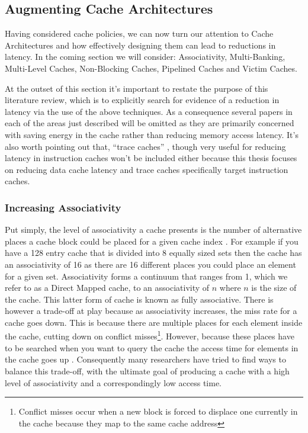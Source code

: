 \subsection{Augmenting Cache Architectures}
Having considered cache policies, we can now turn our attention to Cache Architectures and how effectively designing them can lead to reductions in latency. In the coming section we will consider: Associativity, Multi-Banking, Multi-Level Caches, Non-Blocking Caches, Pipelined Caches and Victim Caches. 

At the outset of this section it's important to restate the purpose of this literature review, which is to explicitly search for evidence of a reduction in latency via the use of the above techniques. As a consequence several papers in each of the areas just described will be omitted as they are primarily concerned with saving energy in the cache rather than reducing memory access latency. It's also worth pointing out that, ``trace caches''\cite{rotenbergTraceCacheMicroarchitecture1999, ramirezTraceCacheRedundancy2000} , though very useful for reducing latency in instruction caches won't be included either because this thesis focuses on reducing data cache latency and trace caches specifically target instruction caches.

\subsubsection{Increasing Associativity}

Put simply, the level of associativity a cache presents is the number of alternative places a cache block could be placed for a given cache index \cite{pachecoParallelHardwareParallel2011}. For example if you have a 128 entry cache that is divided into 8 equally sized sets then the cache has an associativity of 16 as there are 16 different places you could place an element for a given set. Associativity forms a continuum that ranges from 1, which we refer to as a Direct Mapped cache, to an associativity of $n$ where $n$ is the size of the cache. This latter form of cache is known as fully associative. There is however a trade-off at play because as associativity increases, the miss rate for a cache goes down. This is because there are multiple places for each element inside the cache, cutting down on conflict misses\footnote{Conflict misses occur when a new block is forced to displace one currently in the cache because they map to the same cache address}. However, because these places have to be searched when you want to query the cache the access time for elements in the cache goes up \cite{kesslerInexpensiveImplementationsSetAssociativity1989}. Consequently many researchers have tried to find ways to balance this trade-off, with the ultimate goal of producing a cache with a high level of associativity and a correspondingly low access time. 

